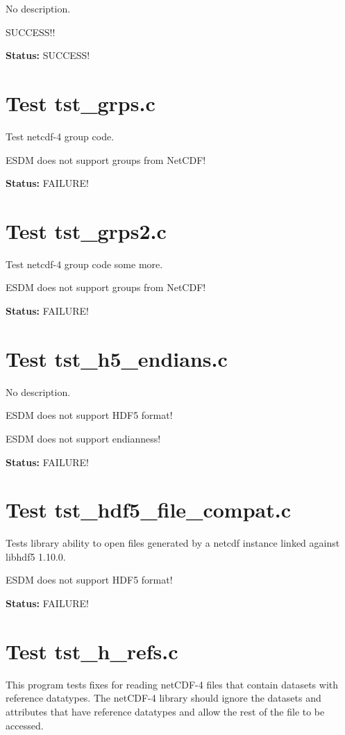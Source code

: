 No description.

SUCCESS!!

{\bf \large Status: } SUCCESS!

\section{Test tst\_grps.c}

Test netcdf-4 group code.

ESDM does not support groups from NetCDF!

{\bf \large Status: } FAILURE!

\section{Test tst\_grps2.c}

Test netcdf-4 group code some more.

ESDM does not support groups from NetCDF!

{\bf \large Status: } FAILURE!

\section{Test tst\_h5\_endians.c}

No description.

ESDM does not support HDF5 format!

ESDM does not support endianness!

{\bf \large Status: } FAILURE!

\section{Test tst\_hdf5\_file\_compat.c}

Tests library ability to open files generated by a netcdf instance linked against libhdf5 1.10.0.

ESDM does not support HDF5 format!

{\bf \large Status: } FAILURE!

\section{Test tst\_h\_refs.c}

This program tests fixes for reading netCDF-4 files that contain datasets with reference datatypes.  The netCDF-4 library should ignore the datasets and attributes that have reference datatypes and allow the rest of the file to be accessed.

